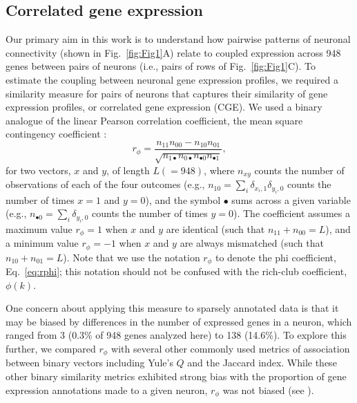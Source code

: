 \documentclass[10pt,letterpaper]{article}
\begin{document}
\subsection*{Correlated gene expression}
Our primary aim in this work is to understand how pairwise patterns of neuronal connectivity (shown in Fig.~\ref{fig:Fig1}A) relate to coupled expression across 948 genes between pairs of neurons (i.e., pairs of rows of Fig.~\ref{fig:Fig1}C).
To estimate the coupling between neuronal gene expression profiles, we required a similarity measure for pairs of neurons that captures their similarity of gene expression profiles, or correlated gene expression (CGE).
We used a binary analogue of the linear Pearson correlation coefficient, the mean square contingency coefficient \cite{Warrens2008}:
\begin{equation} \label{eq:rphi}
    r_\phi = \frac{n_{11}n_{00} - n_{10}n_{01}}{\sqrt{n_{1\bullet}n_{0\bullet}n_{\bullet 0}n_{\bullet 1}}},
\end{equation}
for two vectors, $x$ and $y$, of length $L (=948)$, where $n_{xy}$ counts the number of observations of each of the four outcomes (e.g., $n_{10} = \sum_i \delta_{x_i,1}\delta_{y_i,0}$ counts the number of times $x=1$ and $y=0$), and the symbol $\bullet$ sums across a given variable (e.g., $n_{\bullet 0} = \sum_i \delta_{y_i,0}$ counts the number of times $y = 0$).
The coefficient assumes a maximum value $r_\phi = 1$ when $x$ and $y$ are identical (such that $n_{11} + n_{00} = L$), and a minimum value $r_\phi = -1$ when $x$ and $y$ are always mismatched (such that $n_{10} + n_{01} = L$).
Note that we use the notation $r_\phi$ to denote the phi coefficient, Eq.~\eqref{eq:rphi}; this notation should not be confused with the rich-club coefficient, $\phi(k)$.

One concern about applying this measure to sparsely annotated data is that it may be biased by differences in the number of expressed genes in a neuron, which ranged from 3 (0.3\% of 948 genes analyzed here) to 138 (14.6\%).
To explore this further, we compared $r_\phi$ with several other commonly used metrics of association between binary vectors including Yule's $Q$ and the Jaccard index.
While these other binary similarity metrics exhibited strong bias with the proportion of gene expression annotations made to a given neuron, $r_\phi$ was not biased (see ).
\end{document}
